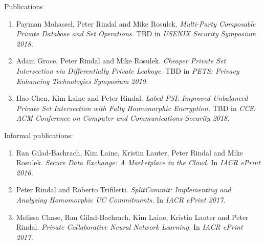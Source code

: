 \documentclass{resume} %
\begin{document}
\begin{rSection}{Publications}
\begin{enumerate}[label=*C\arabic* --]
	\item Payman Mohassel, Peter Rindal and Mike Rosulek. \emph{Multi-Party Composable Private Database and Set Operations.} TBD in \emph{USENIX Security Symposium 2018.}

	\item Adam Groce, Peter Rindal and Mike Rosulek. \emph{Cheaper Private Set Intersection  via Differentially Private Leakage.}  TBD in \emph{PETS: Privacy Enhancing Technologies Symposium 2019.}
	
	\item Hao Chen, Kim Laine and Peter Rindal. \emph{Labed-PSI: Improved Unbalanced Private Set Intersection with Fully Homomorphic Encryption.} TBD in \emph{CCS: ACM Conference on Computer and Communications Security 2018.}
\end{enumerate}

\bigskip 
Informal publications:
\begin{enumerate}[label=I\arabic* --]
	
	\item Ran Gilad-Bachrach, Kim Laine, Kristin Lauter, Peter Rindal and Mike Rosulek. \emph{Secure Data Exchange: A Marketplace in the Cloud.} In \emph{IACR ePrint 2016.}
		
	\item Peter Rindal and Roberto Trifiletti. \emph{SplitCommit: Implementing and Analyzing Homomorphic UC Commitments.} In \emph{IACR ePrint 2017.}
	
	\item Melissa Chase, Ran Gilad-Bachrach, Kim Laine, Kristin Lauter and Peter Rindal. \emph{Private Collaborative Neural Network Learning.} In \emph{IACR ePrint 2017.}
\end{enumerate}
 

\end{rSection}



\end{document}
